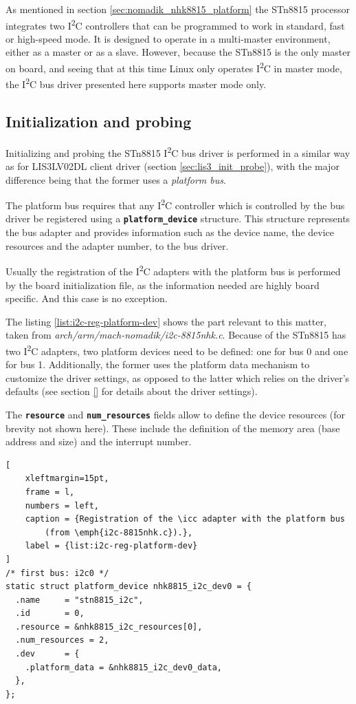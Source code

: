 \documentclass[a4paper,10pt]{article}
\newcommand{\icc}{I\textsuperscript{2}C }
\newcommand{\keyword}[1]{\texttt{\textbf{#1}}}
\begin{document}
\begin{multicols}{2}
As mentioned in section \ref{sec:nomadik_nhk8815_platform} the STn8815 processor
integrates two \icc controllers that can be programmed to work in standard, fast
or high-speed mode. It is designed to operate in a multi-master environment,
either as a master or as a slave. However, because the STn8815 is the only master
on board, and seeing that at this time Linux only operates \icc in master mode, 
the \icc bus driver presented here supports master mode only.


\subsection{Initialization and probing}
\label{sec:adapter_init_probe}
Initializing and probing the STn8815 \icc bus driver is performed in a similar
way as for LIS3LV02DL client driver (section \ref{sec:lis3_init_probe}), with
the major difference being that the former uses a \emph{platform bus}.

The platform bus requires that any \icc controller which is controlled by the
bus driver be registered using a \keyword{platform\_device} structure.
This structure represents the bus adapter and provides information such as the
device name, the device resources and the adapter number, to the bus driver.

Usually the registration of the \icc adapters with the platform bus is
performed by the board initialization file, as the information needed are
highly board specific. And this case is no exception.

The listing \ref{list:i2c-reg-platform-dev} shows the part relevant to this
matter, taken from \emph{arch/arm/mach-nomadik/i2c-8815nhk.c}. Because of the
STn8815 has two \icc adapters, two platform devices need to be defined: one for
bus 0 and one for bus 1.
Additionally, the former uses the platform data mechanism to customize the
driver settings, as opposed to the latter which relies on the driver's defaults
(see section \ref{} for details about the driver settings).

The \keyword{resource} and \keyword{num\_resources} fields allow to define
the device resources (for brevity not shown here). These include the
definition of the memory area (base address and size) and the interrupt number.

\begin{lstlisting}[
	xleftmargin=15pt,
	frame = l,
	numbers = left,
	caption = {Registration of the \icc adapter with the platform bus
		(from \emph{i2c-8815nhk.c}).},
	label = {list:i2c-reg-platform-dev}
]
/* first bus: i2c0 */
static struct platform_device nhk8815_i2c_dev0 = {
  .name		= "stn8815_i2c",
  .id		= 0,
  .resource	= &nhk8815_i2c_resources[0],
  .num_resources = 2,
  .dev		= {
    .platform_data = &nhk8815_i2c_dev0_data,
  },
};


\end{lstlisting}
\end{multicols}
\end{document}
